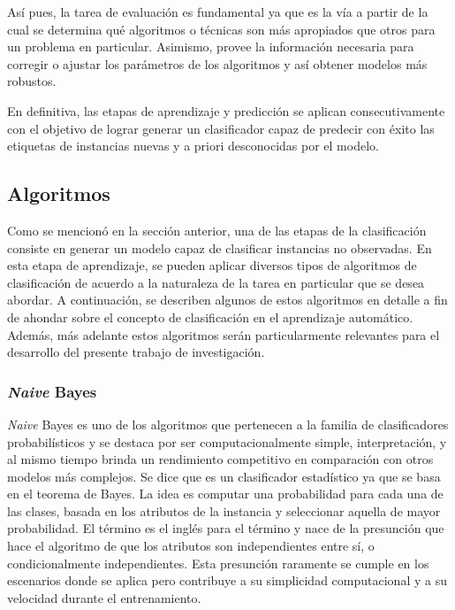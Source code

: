 Así pues, la tarea de evaluación es fundamental ya que es la vía a partir de la
cual se determina qué algoritmos o técnicas son más apropiados que otros para un
problema en particular. Asimismo, provee la información necesaria para corregir
o ajustar los parámetros de los algoritmos y así obtener modelos más robustos.

En definitiva, las etapas de aprendizaje y predicción se aplican
consecutivamente con el objetivo de lograr generar un clasificador capaz de
predecir con éxito las etiquetas de instancias nuevas y a priori desconocidas
por el modelo.

\subsection{Algoritmos}
\label{clasificacion_algoritmos}

Como se mencionó en la sección anterior, una de las etapas de la clasificación
consiste en generar un modelo capaz de clasificar instancias no observadas. En
esta etapa de aprendizaje, se pueden aplicar diversos tipos de algoritmos de
clasificación de acuerdo a la naturaleza de la tarea en particular que se desea
abordar. A continuación, se describen algunos de estos algoritmos en detalle a
fin de ahondar sobre el concepto de clasificación en el aprendizaje automático.
Además, más adelante estos algoritmos serán particularmente relevantes para el
desarrollo del presente trabajo de investigación.

\subsubsection{\textit{Naive} Bayes}

\textit{Naive} Bayes es uno de los algoritmos que pertenecen a la familia de
clasificadores probabilísticos y se destaca por ser computacionalmente simple,
interpretación, y al mismo tiempo brinda un  rendimiento competitivo en
comparación con otros modelos más complejos. Se dice que es un clasificador
estadístico ya que se basa en el teorema de Bayes. La idea es computar una
probabilidad para cada una de las clases, basada en los atributos de la
instancia y seleccionar aquella de mayor probabilidad. El término
 es el inglés para el término
 y nace de la presunción que hace el algoritmo de que
los atributos son independientes entre sí, o condicionalmente independientes.
Esta presunción raramente se cumple en los escenarios donde se aplica pero
contribuye a su simplicidad computacional y a su velocidad durante el
entrenamiento.

